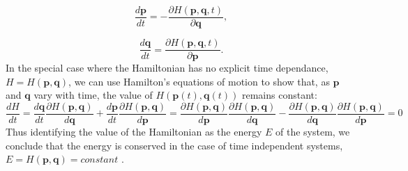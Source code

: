 \begin{equation}
\frac{d \bm{p}}{dt} =-\frac{\partial H(\bm{p},\bm{q},t)}{\partial \bm{q}},
\label{eq:pdot_hamil}
\end{equation}
\par 
\begin{equation}
\frac{d \bm{q}}{dt} =\frac{\partial H(\bm{p},\bm{q},t)}{\partial \bm{p}}.
\label{eq:qdot_hamil}
\end{equation}
In the special case where the Hamiltonian has no explicit time dependance, $H=H(\bm{p},\bm{q})$, we can use Hamilton's equations of motion to show that, as $\bm{p}$ and $\bm{q}$ vary with time, the value of $H(\bm{p}(t),\bm{q}(t))$ remains constant:
\begin{equation*}
\frac{dH}{dt}=\frac{d\bm{q}}{dt}\frac{\partial H(\bm{p},\bm{q})}{d\bm{q}}+\frac{d\bm{p}}{dt}\frac{\partial H(\bm{p},\bm{q})}{d\bm{p}}=\frac{\partial H(\bm{p},\bm{q})}{d\bm{p}}\frac{\partial H(\bm{p},\bm{q})}{d\bm{q}}-\frac{\partial H(\bm{p},\bm{q})}{d\bm{q}}\frac{\partial H(\bm{p},\bm{q})}{d\bm{p}}=0
\end{equation*}
Thus identifying the value of the Hamiltonian as the energy $E$ of the system, we conclude that the energy is conserved in the case of time independent systems, $E=H(\bm{p},\bm{q})=constant$ \cite{ottChaosDynamicalSystems2002}.\par

